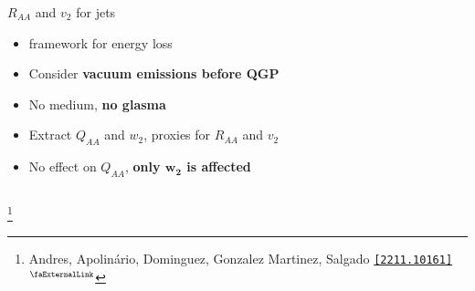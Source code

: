 \documentclass[aspectratio=169,11pt,usenames,dvipsnames]{beamer}
\renewcommand{\thefootnote}{\color{customblue}\faPaperPlaneO}
\newcommand\blfootnote[1]{%
  \begingroup
  \renewcommand\thefootnote{}\footnote{#1}%
  \addtocounter{footnote}{-1}%
  \endgroup
}
\begin{document}
\begin{frame}[t,noframenumbering]
\begin{columns}[onlytextwidth,t]
\begin{center}
            {\Large\color{palteal} $R_{AA}$ and $v_2$ for jets \\[10pt]}
            \footnotesize
                \begin{itemize}
                    \item {\color{lightgray}{\bfseries BDMPS-Z} framework for energy loss}
                    \item {\color{lightgray}Consider {\bfseries vacuum emissions before QGP}}
                    \item {\color{lightgray}No medium, {\bfseries no glasma}}
                    \item {\color{lightgray}Extract $Q_{AA}$ and $w_2$, proxies for $R_{AA}$ and $v_2$}
                    \item {\color{lightgray}No effect on $Q_{AA}$, {\bfseries only $\boldsymbol{w_2}$ is affected}}
                \end{itemize}
        \end{center}
    \end{columns}
    \blfootnote{\scriptsize Andres, Apolinário, Dominguez, Gonzalez Martinez, Salgado \href{https://arxiv.org/abs/2211.10161}{\color{palgold}\texttt{[2211.10161]}$^\text{\scalebox{0.9}{\faExternalLink}}$}}
\end{frame}



\end{document}
